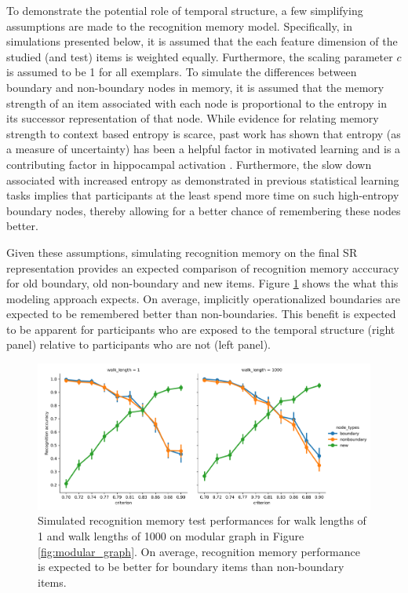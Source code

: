 To demonstrate the potential role of temporal structure, a few simplifying assumptions are  made to the recognition memory model. Specifically, in simulations presented below, it is assumed that the each feature dimension of the studied (and test) items is weighted equally. Furthermore, the scaling parameter $c$ is assumed to be 1 for all exemplars. To simulate the differences between boundary and non-boundary nodes in memory, it is assumed that the memory strength of an item associated with each node is proportional to the entropy in its successor representation of that node. While evidence for relating memory strength to context based entropy is scarce, past work has shown that entropy (as a measure of uncertainty) has been a helpful factor in motivated learning and is a contributing factor in hippocampal activation \cite{davis2012striatal}. Furthermore, the slow down associated with increased entropy as demonstrated in previous statistical learning tasks \cite{lynn2020abstract,lynn2020human,lynn2020humans} implies that participants at the least spend more time on such high-entropy boundary nodes, thereby allowing for a better chance of remembering these nodes better. 

Given these assumptions, simulating recognition memory on the final SR representation provides an expected comparison of recognition memory acccuracy for old boundary, old non-boundary and new items. Figure \ref{fig:recog_memory_sims_with_criterion} shows the what this modeling approach expects. On average, implicitly operationalized boundaries are expected to be remembered better than non-boundaries. This benefit is expected to be apparent for participants who are exposed to the temporal structure (right panel) relative to participants who are not (left panel).

\begin{figure}[ht]
    \label{fig:recog_memory_sims_with_criterion}
    \centering
    \includegraphics[width = \textwidth]{chapter_notebooks/chapter_3/figures/recog_memory_with_criterion.png}
    \caption{Simulated recognition memory test performances for walk lengths of 1 and walk lengths of 1000 on modular graph in Figure \ref{fig:modular_graph}. On average, recognition memory performance is expected to be better for boundary items than non-boundary items.}
\end{figure}



